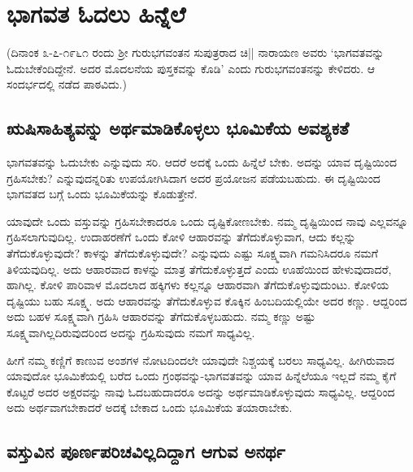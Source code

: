 \chapter{ಭಾಗವತ ಓದಲು ಹಿನ್ನೆಲೆ}

(ದಿನಾಂಕ ೩-೭-೧೯೬೧ ರಂದು ಶ್ರೀ ಗುರುಭಗವಂತನ ಸುಪುತ್ರರಾದ ಚಿ|| ನಾರಾಯಣ ಅವರು `ಭಾಗವತವನ್ನು ಓದುಬೇಕೆಂದಿದ್ದೇನೆ. ಅದರ ಮೊದಲನೆಯ ಪುಸ್ತಕವನ್ನು ಕೊಡಿ' ಎಂದು ಗುರುಭಗವಂತನನ್ನು ಕೇಳಿದರು. ಆ‌ ಸಂದರ್ಭದಲ್ಲಿ ನಡೆದ ಪಾಠವಿದು.)

\section*{ಋಷಿಸಾಹಿತ್ಯವನ್ನು ಅರ್ಥಮಾಡಿಕೊಳ್ಳಲು ಭೂಮಿಕೆಯ ಅವಶ್ಯಕತೆ}

ಭಾಗವತವನ್ನು ಓದುಬೇಕು ಎನ್ನುವುದು ಸರಿ. ಆದರೆ ಅದಕ್ಕೆ ಒಂದು ಹಿನ್ನೆಲೆ ಬೇಕು. ಅದನ್ನು ಯಾವ ದೃಷ್ಟಿಯಿಂದ ಗ್ರಹಿಸಬೇಕು? ಎನ್ನುವುದನ್ನರಿತು ಉಪಯೋಗಿಸಿದಾಗ ಅದರ ಪ್ರಯೋಜನ ಪಡೆಯಬಹುದು. ಈ ದೃಷ್ಟಿಯಿಂದ ಭಾಗವತದ ಬಗ್ಗೆ ಒಂದು ಭೂಮಿಕೆಯನ್ನು ಕೊಡುತ್ತೇನೆ.

ಯಾವುದೇ ಒಂದು ವಸ್ತುವನ್ನು ಗ್ರಹಿಸಬೇಕಾದರೂ ಒಂದು ದೃಷ್ಟಿಕೋಣಬೇಕು. ನಮ್ಮ ದೃಷ್ಟಿಯಿಂದ ನಾವು ಎಲ್ಲವನ್ನೂ ಗ್ರಹಿಸಲಾಗುವುದಿಲ್ಲ. ಉದಾಹರಣೆಗೆ ಒಂದು ಕೋಳಿ ಆಹಾರವನ್ನು  ತೆಗೆದುಕೊಳ್ಳುವಾಗ, ಆದು ಕಲ್ಲನ್ನು ತೆಗೆದುಕೊಳ್ಳುವುದೇ? ಕಾಳನ್ನು  ತೆಗೆದುಕೊಳ್ಳುವುದೇ? ಎನ್ನುವುದು ಎಷ್ಟು ಸೂಕ್ಷ್ಮವಾಗಿ ಗಮನಿಸಿದರೂ ನಮಗೆ ತಿಳಿಯವುದಿಲ್ಲ. ಅದು ಆಹಾರವಾದ ಕಾಳನ್ನು ಮಾತ್ರ ತೆಗೆದುಕೊಳ್ಳುತ್ತದೆ ಎಂದು ಊಹೆಯಿಂದ ಹೇಳುವುದಾದರೆ, ಹಾಗಿಲ್ಲ. ಕೋಳಿ ಪಾರಿವಾಳ ಮೊದಲಾದ ಹಕ್ಕಿಗಳು ಕಲ್ಲನ್ನೂ ಆಹಾರವಾಗಿ ತೆಗೆದುಕೊಳ್ಳುವುದುಂಟು. ಕೋಳಿಯ ದೃಷ್ಟಿಯು ಬಹು ಸೂಕ್ಷ್ಮ. ಅದು ಆಹಾರವನ್ನು ತೆಗೆದುಕೊಳ್ಳುವ ಕೊಕ್ಕಿನ ಹಿಂಬದಿಯಲ್ಲಿಯೇ ಅದರ ಕಣ್ಣು. ಆದ್ದರಿಂದ ಅದು ಬಹಳ ಸೂಕ್ಷ್ಮವಾಗಿ ಗ್ರಹಿಸಿ ಆಹಾರವನ್ನು ತೆಗೆದುಕೊಳ್ಳಬಹುದು. ನಮ್ಮ ಕಣ್ಣು ಅಷ್ಟು ಸೂಕ್ಷ್ಮವಾಗಿಲ್ಲದಿರುವುದರಿಂದ ಅದನ್ನು ಗ್ರಹಿಸುವುದು ನಮಗೆ ಸಾಧ್ಯವಿಲ್ಲ. 

ಹೀಗೆ ನಮ್ಮ ಕಣ್ಣಿಗೆ ಕಾಣುವ ಅಂಶಗಳ ನೋಟದಿಂದಲೇ ಯಾವುದೇ ನಿಶ್ಚಯಕ್ಕೆ ಬರಲು ಸಾಧ್ಯವಿಲ್ಲ. ಹೀಗಿರುವಾದ ಯಾವುದೋ ಭೂಮಿಕೆಯಲ್ಲಿ ಬರೆದ ಒಂದು ಗ್ರಂಥವನ್ನು-ಭಾಗವತವನ್ನು ಯಾವ ಹಿನ್ನೆಲೆಯೂ ಇಲ್ಲದೆ ನಮ್ಮ ಕೈಗೆ ಕೊಟ್ಟರೆ ಅದರ ಅಕ್ಷರವನ್ನು ನಾವು ಓದಬಹುದಾದರೂ ಅದನ್ನು ಅರ್ಥಮಾಡಿಕೊಳ್ಳುವುದು ಸಾಧ್ಯವಿಲ್ಲ. ಆದ್ದರಿಂದ ಅದು ಅರ್ಥವಾಗಬೇಕಾದರೆ ಅದಕ್ಕೆ ಬೇಕಾದ ಒಂದು ಭೂಮಿಕೆಯ ತಯಾರಾಬೇಕು. 


\section*{ವಸ್ತುವಿನ ಪೂರ್ಣಪರಿಚವಿಲ್ಲದಿದ್ದಾಗ ಆಗುವ ಅನರ್ಥ}

